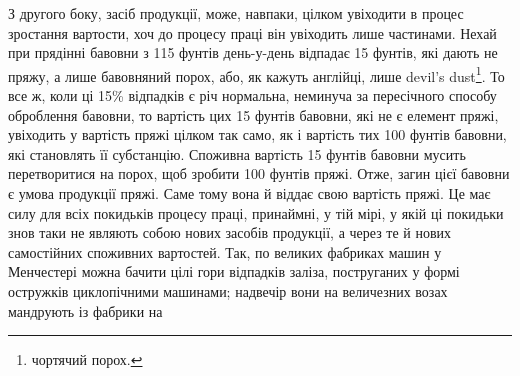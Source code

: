 З другого боку, засіб продукції, може, навпаки, цілком увіходити
в процес зростання вартости, хоч до процесу праці він
увіходить лише частинами. Нехай при прядінні бавовни з 115 фунтів
день-у-день відпадає 15 фунтів, які дають не пряжу,
а лише бавовняний порох, або, як кажуть англійці, лише devil’s
dust\footnote*{
чортячий порох. 
}. То все ж, коли ці 15\% відпадків є річ нормальна, неминуча
за пересічного способу оброблення бавовни, то вартість цих
15 фунтів бавовни, які не є елемент пряжі, увіходить у вартість
пряжі цілком так само, як і вартість тих 100 фунтів бавовни,
які становлять її субстанцію. Споживна вартість 15 фунтів бавовни
мусить перетворитися на порох, щоб зробити 100 фунтів
пряжі. Отже, загин цієї бавовни є умова продукції пряжі. Саме
тому вона й віддає свою вартість пряжі. Це має силу для всіх
покидьків процесу праці, принаймні, у тій мірі, у якій ці покидьки
знов таки не являють собою нових засобів продукції, а через
те й нових самостійних споживних вартостей. Так, по великих
фабриках машин у Менчестері можна бачити цілі гори відпадків
заліза, поструганих у формі остружків циклопічними машинами;
надвечір вони на величезних возах мандрують із фабрики на
\parbreak{}  %
